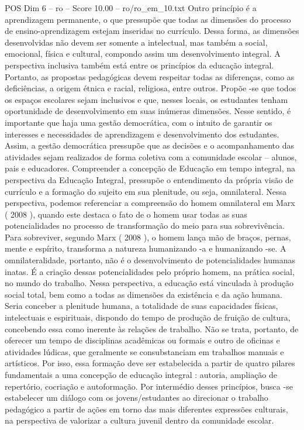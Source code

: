 \begin{textsample}{POS Dim 6 – ro – Score 10.00 – ro/ro\_em\_10.txt}
Outro princípio é a aprendizagem permanente, o que pressupõe que todas as dimensões do processo de ensino-aprendizagem estejam inseridas no currículo.
Dessa forma, as dimensões desenvolvidas não devem ser somente a intelectual, mas também a social, emocional, física e cultural, compondo assim um desenvolvimento integral.
A perspectiva inclusiva também está entre os princípios da educação integral.
Portanto, as propostas pedagógicas devem respeitar todas as diferenças, como as deficiências, a origem étnica e racial, religiosa, entre outros.
Propõe -se que todos os espaços escolares sejam inclusivos e que, nesses locais, os estudantes tenham oportunidade de desenvolvimento em suas inúmeras dimensões.
Nesse sentido, é importante que haja uma gestão democrática, com o intuito de garantir os interesses e necessidades de aprendizagem e desenvolvimento dos estudantes.
Assim, a gestão democrática pressupõe que as decisões e o acompanhamento das atividades sejam realizados de forma coletiva com a comunidade escolar – alunos, pais e educadores.
Compreender a concepção de Educação em tempo integral, na perspectiva da Educação Integral, pressupõe o entendimento da própria visão de currículo e a formação do sujeito em sua plenitude, ou seja, omnilateral.
Nessa perspectiva, podemos referenciar a compreensão do homem omnilateral em Marx ( 2008 ), quando este destaca o fato de o homem usar todas as suas potencialidades no processo de transformação do meio para sua sobrevivência.
Para sobreviver, segundo Marx ( 2008 ), o homem lança mão de braços, pernas, mente e espírito, transforma a natureza humanizando -a e humanizando -se.
A omnilateralidade, portanto, não é o desenvolvimento de potencialidades humanas inatas.
É a criação dessas potencialidades pelo próprio homem, na prática social, no mundo do trabalho.
Nessa perspectiva, a educação está vinculada à produção social total, bem como a todas as dimensões da existência e da ação humana.
Seria conceber a plenitude humana, a totalidade de suas capacidades físicas, intelectuais e espirituais, dispondo do tempo de produção de fruição de cultura, concebendo essa como inerente às relações de trabalho.
Não se trata, portanto, de oferecer um tempo de disciplinas acadêmicas ou formais e outro de oficinas e atividades lúdicas, que geralmente se consubstanciam em trabalhos manuais e artísticos.
Por isso, essa formação deve ser estabelecida a partir de quatro pilares fundamentais a uma concepção de educação integral : autoria, ampliação de repertório, cocriação e autoformação.
Por intermédio desses princípios, busca -se estabelecer um diálogo com os jovens/estudantes ao direcionar o trabalho pedagógico a partir de ações em torno das mais diferentes expressões culturais, na perspectiva de valorizar a cultura juvenil dentro da comunidade escolar.

\end{textsample}
